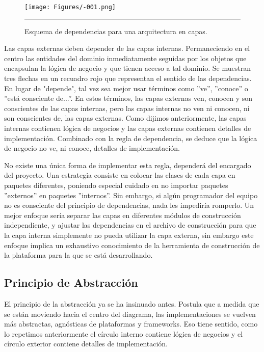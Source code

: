 \begin{figure}[htbp]
	\centering
	\texttt{[image: Figures/-001.png]}
	\rule{35em}{1pt}
	\caption[Principio de Dependecias]{Esquema de dependencias para una arquitectura en capas.}
	\label{fig:Diagrama_clasico}
\end{figure}


Las capas externas deben depender de las capas internas. Permaneciendo en el centro las entidades del dominio inmediatamente seguidas por los objetos que encapsulan la lógica de negocio y que tienen acceso a tal dominio.  Se muestran tres flechas en un recuadro rojo que representan el sentido de las dependencias. En lugar de "depende", tal vez sea mejor usar términos como ''ve'', ''conoce'' o ''está consciente de...''. En estos términos, las capas externas ven, conocen y son conscientes de las capas internas, pero las capas internas no ven ni conocen, ni son conscientes de, las capas externas. Como dijimos anteriormente, las capas internas contienen lógica de negocios y las capas externas contienen detalles de implementación. Combinado con la regla de dependencia, se deduce que la lógica de negocio no ve, ni conoce, detalles de implementación.

No existe una única forma de implementar esta regla, dependerá del encargado del proyecto. Una estrategia consiste en colocar las clases de cada capa en paquetes diferentes, poniendo especial cuidado en no importar paquetes ''externos'' en paquetes ''internos''. Sin embargo, si algún programador del equipo no es consciente del principio de dependencias, nada les impediría romperlo. Un mejor enfoque sería separar las capas en diferentes módulos de construcción independiente, y ajustar las dependencias en el archivo de construcción para que la capa interna simplemente no pueda utilizar la capa externa, sin embargo este enfoque implica un exhaustivo conocimiento de la herramienta de construcción de la plataforma para la que se está desarrollando.

\subsection{Principio de Abstracción}
El principio de la abstracción ya se ha insinuado antes. Postula que a medida que se están moviendo hacia el centro del diagrama, las implementaciones se vuelven más abstractas, agnósticas de plataformas y frameworks. Eso tiene sentido, como lo repetimos anteriormente el círculo interno contiene lógica de negocios y el círculo exterior contiene detalles de implementación.

